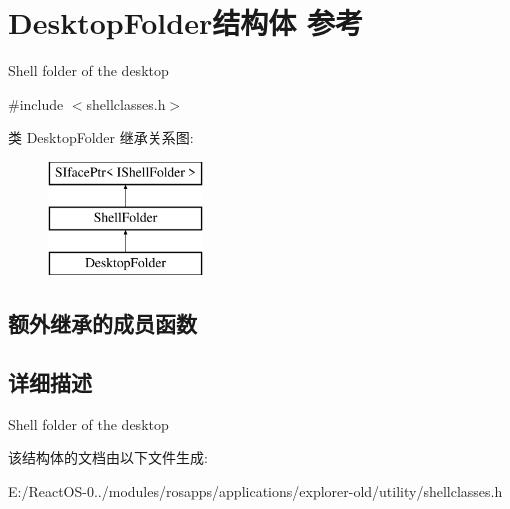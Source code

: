 \hypertarget{struct_desktop_folder}{}\section{Desktop\+Folder结构体 参考}
\label{struct_desktop_folder}


Shell folder of the desktop  




{\ttfamily \#include $<$shellclasses.\+h$>$}

类 Desktop\+Folder 继承关系图\+:\begin{figure}[H]
\begin{center}
\leavevmode
\includegraphics[height=3.000000cm]{struct_desktop_folder}
\end{center}
\end{figure}
\subsection*{额外继承的成员函数}


\subsection{详细描述}
Shell folder of the desktop 

该结构体的文档由以下文件生成\+:\begin{DoxyCompactItemize}
\item 
E\+:/\+React\+O\+S-\/0../modules/rosapps/applications/explorer-\/old/utility/shellclasses.\+h\end{DoxyCompactItemize}
